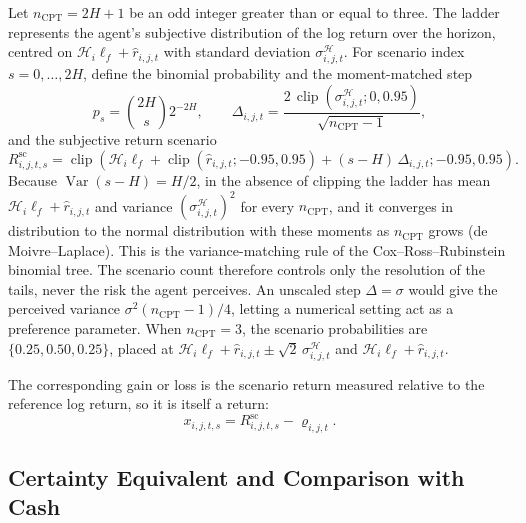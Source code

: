 \documentclass[12pt, a4paper]{article}
\DeclareMathOperator{\clip}{clip}
\begin{document}
    Let \(n_{\mathrm{CPT}}=2H+1\) be an odd integer greater than or equal to
    three. The ladder represents the agent's subjective distribution of the log
    return over the horizon, centred on \(\mathcal H_i\ell_f+\hat r_{i,j,t}\) with
    standard deviation \(\sigma_{i,j,t}^{\mathcal H}\). For scenario index
    \(s=0,\ldots,2H\), define the binomial probability and the moment-matched step
    \[
        p_s=\binom{2H}{s}2^{-2H},
        \qquad
        \Delta_{i,j,t}=\frac{2\,\clip(\sigma_{i,j,t}^{\mathcal H};0,0.95)}{\sqrt{n_{\mathrm{CPT}}-1}},
    \]
    and the subjective return scenario
    \[
        R_{i,j,t,s}^{\mathrm{sc}}
        =
        \clip\!\left(
                   \mathcal H_i\ell_f+\clip(\hat r_{i,j,t};-0.95,0.95)
                   +(s-H)\,\Delta_{i,j,t};
            -0.95,0.95
        \right).
    \]
    Because \(\operatorname{Var}(s-H)=H/2\), in the absence of clipping the
    ladder has mean \(\mathcal H_i\ell_f+\hat r_{i,j,t}\) and variance
    \((\sigma_{i,j,t}^{\mathcal H})^2\) for every \(n_{\mathrm{CPT}}\), and it
    converges in distribution to the normal distribution with these moments as
    \(n_{\mathrm{CPT}}\) grows (de Moivre--Laplace). This is the variance-matching
    rule of the Cox--Ross--Rubinstein binomial tree. The scenario count therefore
    controls only the resolution of the tails, never the risk the agent
    perceives. An unscaled step \(\Delta=\sigma\) would give the perceived
    variance \(\sigma^2(n_{\mathrm{CPT}}-1)/4\), letting a numerical setting act as
    a preference parameter. When \(n_{\mathrm{CPT}}=3\), the scenario
    probabilities are \(\{0.25,0.50,0.25\}\), placed at
    \(\mathcal H_i\ell_f+\hat r_{i,j,t}\pm\sqrt2\,\sigma_{i,j,t}^{\mathcal H}\) and
    \(\mathcal H_i\ell_f+\hat r_{i,j,t}\).

    The corresponding gain or loss is the scenario return measured relative to the
    reference log return, so it is itself a return:
    \[
        x_{i,j,t,s}=R_{i,j,t,s}^{\mathrm{sc}}-\varrho_{i,j,t}.
    \]

    \subsection{Certainty Equivalent and Comparison with Cash}\label{sec:cpt_premium}
\end{document}
